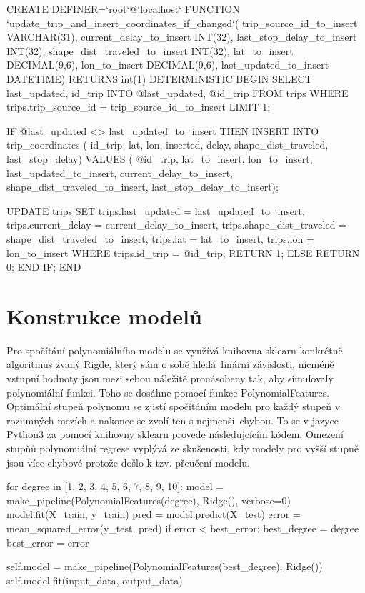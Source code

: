 \begin{code}[frame=none]
CREATE DEFINER=`root`@`localhost` FUNCTION
  `update_trip_and_insert_coordinates_if_changed`(
  trip_source_id_to_insert VARCHAR(31),
  current_delay_to_insert INT(32),
    last_stop_delay_to_insert INT(32),
  shape_dist_traveled_to_insert INT(32),
  lat_to_insert DECIMAL(9,6),
  lon_to_insert DECIMAL(9,6),
  last_updated_to_insert DATETIME) RETURNS int(1)
    DETERMINISTIC
BEGIN
  SELECT last_updated, id_trip
  INTO @last_updated, @id_trip
  FROM trips
  WHERE trips.trip_source_id = trip_source_id_to_insert
  LIMIT 1;

  IF @last_updated <> last_updated_to_insert THEN
    INSERT INTO trip_coordinates (
      id_trip,
      lat,
      lon,
      inserted,
      delay,
      shape_dist_traveled,
      last_stop_delay)
    VALUES (
      @id_trip,
      lat_to_insert,
      lon_to_insert,
      last_updated_to_insert,
      current_delay_to_insert,
      shape_dist_traveled_to_insert,
      last_stop_delay_to_insert);

    UPDATE trips
    SET trips.last_updated = last_updated_to_insert,
      trips.current_delay = current_delay_to_insert,
      trips.shape_dist_traveled = shape_dist_traveled_to_insert,
      trips.lat = lat_to_insert,
      trips.lon = lon_to_insert
    WHERE trips.id_trip = @id_trip;
        RETURN 1;
  ELSE
    RETURN 0;
  END IF;
END
\end{code}


\section{Konstrukce modelů} \label{section:konstrukce_modelu}

Pro spočítání polynomiálního modelu se využívá knihovna sklearn konkrétně algoritmus zvaný Rigde, který sám o sobě hledá linární závislosti, nicméně vstupní hodnoty jsou mezi sebou náležitě pronásobeny tak, aby simulovaly polynomiální funkci. Toho se dosáhne pomocí funkce PolynomialFeatures. Optimální stupeň polynomu se zjistí spočítáním modelu pro každý stupeň v rozumných mezích a nakonec se zvolí ten s nejmenší chybou. To se v jazyce Python3 za pomocí knihovny sklearn provede následujcícím kódem. Omezení stupňů polynomiální regrese vyplývá ze skušenosti, kdy modely pro vyšší stupně jsou více chybové protože došlo k tzv. přeučení modelu.

\begin{code}[frame=none]
for degree in [1, 2, 3, 4, 5, 6, 7, 8, 9, 10]:
  model = make_pipeline(PolynomialFeatures(degree), Ridge(), verbose=0)
  model.fit(X_train, y_train)
  pred = model.predict(X_test)
  error = mean_squared_error(y_test, pred)
  if error < best_error:
    best_degree = degree
    best_error = error

self.model = make_pipeline(PolynomialFeatures(best_degree), Ridge())
self.model.fit(input_data, output_data)
\end{code}

